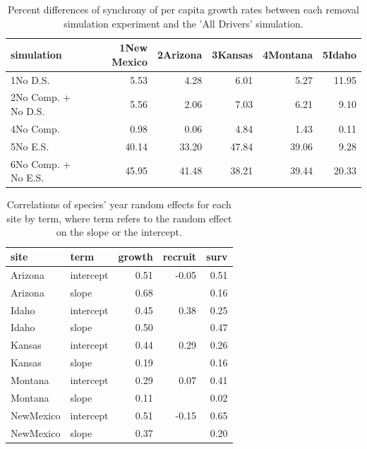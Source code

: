 \documentclass[12pt,]{article}
\begin{document}
\begin{table}[ht]
\centering
\caption{Percent differences of synchrony of per capita growth rates between each removal simulation experiment and the 'All Drivers' simulation.} 
\begin{tabular}{lrrrrr}
  \hline
simulation & 1New Mexico & 2Arizona & 3Kansas & 4Montana & 5Idaho \\ 
  \hline
1No D.S. & 5.53 & 4.28 & 6.01 & 5.27 & 11.95 \\ 
  2No Comp. + No D.S. & 5.56 & 2.06 & 7.03 & 6.21 & 9.10 \\ 
  4No Comp. & 0.98 & 0.06 & 4.84 & 1.43 & 0.11 \\ 
  5No E.S. & 40.14 & 33.20 & 47.84 & 39.06 & 9.28 \\ 
  6No Comp. + No E.S. & 45.95 & 41.48 & 38.21 & 39.44 & 20.33 \\ 
   \hline
\end{tabular}
\end{table}

\begin{table}[ht]
\centering
\caption{Correlations of species' year random effects for each site by term, where term refers to the random effect on the slope or the intercept.} 
\begin{tabular}{llrrr}
  \hline
site & term & growth & recruit & surv \\ 
  \hline
Arizona & intercept & 0.51 & -0.05 & 0.51 \\ 
  Arizona & slope & 0.68 &  & 0.16 \\ 
  Idaho & intercept & 0.45 & 0.38 & 0.25 \\ 
  Idaho & slope & 0.50 &  & 0.47 \\ 
  Kansas & intercept & 0.44 & 0.29 & 0.26 \\ 
  Kansas & slope & 0.19 &  & 0.16 \\ 
  Montana & intercept & 0.29 & 0.07 & 0.41 \\ 
  Montana & slope & 0.11 &  & 0.02 \\ 
  NewMexico & intercept & 0.51 & -0.15 & 0.65 \\ 
  NewMexico & slope & 0.37 &  & 0.20 \\ 
   \hline
\end{tabular}
\end{table}
\end{document}
